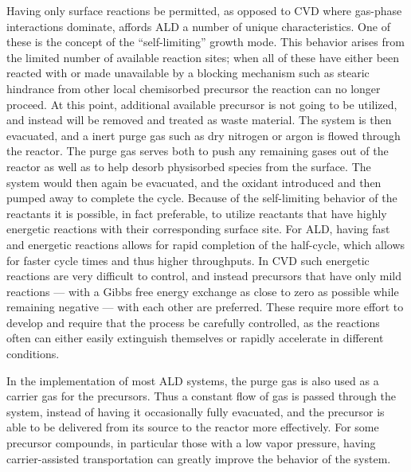 Having only surface reactions be permitted, as opposed to CVD where gas-phase interactions dominate, affords ALD a number of unique characteristics. One of these is the concept of the ``self-limiting'' growth mode.\cite{ALD-Handbook} This behavior arises from the limited number of available reaction sites; when all of these have either been reacted with or made unavailable by a blocking mechanism such as stearic hindrance from other local chemisorbed precursor the reaction can no longer proceed. At this point, additional available precursor is not going to be utilized, and instead will be removed and treated as waste material. The system is then evacuated, and a inert purge gas such as dry nitrogen or argon is flowed through the reactor. The purge gas serves both to push any remaining gases out of the reactor as well as to help desorb physisorbed species from the surface. The system would then again be evacuated, and the oxidant introduced and then pumped away to complete the cycle. Because of the self-limiting behavior of the reactants it is possible, in fact preferable, to utilize reactants that have highly energetic reactions with their corresponding surface site. For ALD, having fast and energetic reactions allows for rapid completion of the half-cycle, which allows for faster cycle times and thus higher throughputs. In CVD such energetic reactions are very difficult to control, and instead precursors that have only mild reactions --- with a Gibbs free energy exchange as close to zero as possible while remaining negative --- with each other are preferred. These require more effort to develop and require that the process be carefully controlled, as the reactions often can either easily extinguish themselves or rapidly accelerate in different conditions.\cite{ALD-Handbook}

In the implementation of most ALD systems, the purge gas is also used as a carrier gas for the precursors. Thus a constant flow of gas is passed through the system, instead of having it occasionally fully evacuated, and the precursor is able to be delivered from its source to the reactor more effectively. For some precursor compounds, in particular those with a low vapor pressure, having carrier-assisted transportation can greatly improve the behavior of the system.\cite{ALD-Handbook} 


